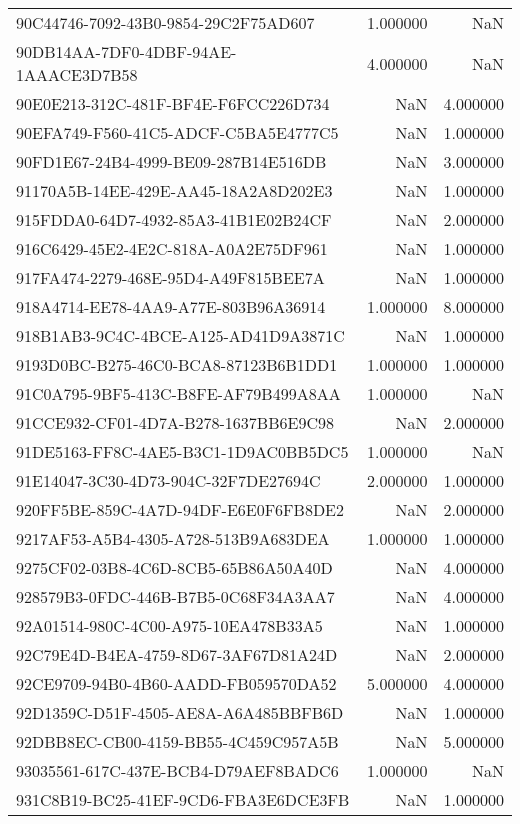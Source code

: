 \begin{tabular}{lrr}
90C44746-7092-43B0-9854-29C2F75AD607 & 1.000000 & NaN \\
90DB14AA-7DF0-4DBF-94AE-1AAACE3D7B58 & 4.000000 & NaN \\
90E0E213-312C-481F-BF4E-F6FCC226D734 & NaN & 4.000000 \\
90EFA749-F560-41C5-ADCF-C5BA5E4777C5 & NaN & 1.000000 \\
90FD1E67-24B4-4999-BE09-287B14E516DB & NaN & 3.000000 \\
91170A5B-14EE-429E-AA45-18A2A8D202E3 & NaN & 1.000000 \\
915FDDA0-64D7-4932-85A3-41B1E02B24CF & NaN & 2.000000 \\
916C6429-45E2-4E2C-818A-A0A2E75DF961 & NaN & 1.000000 \\
917FA474-2279-468E-95D4-A49F815BEE7A & NaN & 1.000000 \\
918A4714-EE78-4AA9-A77E-803B96A36914 & 1.000000 & 8.000000 \\
918B1AB3-9C4C-4BCE-A125-AD41D9A3871C & NaN & 1.000000 \\
9193D0BC-B275-46C0-BCA8-87123B6B1DD1 & 1.000000 & 1.000000 \\
91C0A795-9BF5-413C-B8FE-AF79B499A8AA & 1.000000 & NaN \\
91CCE932-CF01-4D7A-B278-1637BB6E9C98 & NaN & 2.000000 \\
91DE5163-FF8C-4AE5-B3C1-1D9AC0BB5DC5 & 1.000000 & NaN \\
91E14047-3C30-4D73-904C-32F7DE27694C & 2.000000 & 1.000000 \\
920FF5BE-859C-4A7D-94DF-E6E0F6FB8DE2 & NaN & 2.000000 \\
9217AF53-A5B4-4305-A728-513B9A683DEA & 1.000000 & 1.000000 \\
9275CF02-03B8-4C6D-8CB5-65B86A50A40D & NaN & 4.000000 \\
928579B3-0FDC-446B-B7B5-0C68F34A3AA7 & NaN & 4.000000 \\
92A01514-980C-4C00-A975-10EA478B33A5 & NaN & 1.000000 \\
92C79E4D-B4EA-4759-8D67-3AF67D81A24D & NaN & 2.000000 \\
92CE9709-94B0-4B60-AADD-FB059570DA52 & 5.000000 & 4.000000 \\
92D1359C-D51F-4505-AE8A-A6A485BBFB6D & NaN & 1.000000 \\
92DBB8EC-CB00-4159-BB55-4C459C957A5B & NaN & 5.000000 \\
93035561-617C-437E-BCB4-D79AEF8BADC6 & 1.000000 & NaN \\
931C8B19-BC25-41EF-9CD6-FBA3E6DCE3FB & NaN & 1.000000 \\

\end{tabular}
